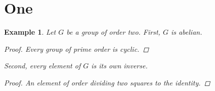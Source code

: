 \documentclass{article}
\newtheorem{ex}{Example}[section]
\begin{document}
\section{One}

\begin{ex}\label{ex:two}
Let $G$ be a group of order two. First, $G$ is abelian.
\begin{proof}
Every group of prime order is cyclic.
\end{proof}
Second, every element of $G$ is its own inverse.
\begin{proof}
An element of order dividing two squares to the identity.
\end{proof}
\end{ex}
\end{document}
